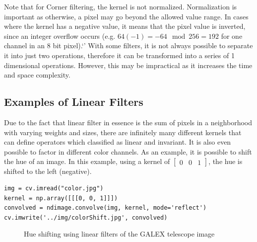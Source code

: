 \documentclass[twoside,a4paper,article]{combine}
\begin{document}
Note that for Corner filtering, the kernel is not normalized. Normalization is important as otherwise, a pixel may go beyond the allowed value range.
In cases where the kernel has a negative value, it means that the pixel value is inverted, since an integer overflow occurs (e.g. $64
(-1)= -64 \mod 256 = 192$ for one channel in an 8 bit pixel).`'
With some filters, it is not always possible to separate it into just two operations, therefore it can be
transformed into a series of 1 dimensional operations. However, this may be impractical as it increases the time and space
complexity.

\subsection{Examples of Linear Filters}
Due to the fact that linear filter in essence is the sum of pixels in a neighborhood with varying weights and sizes, there are infinitely many different kernels that can
define operators which classified as linear and invariant. It is also even possible to factor in different color channels. As an example, it is possible to shift the hue of an image.
In this example, using a kernel of $\begin{bmatrix}0 & 0 & 1\end{bmatrix}$, the hue is shifted to the left (negative).
\lstset{language=Python}
\begin{lstlisting}
img = cv.imread("color.jpg")
kernel = np.array([[[0, 0, 1]]])
convolved = ndimage.convolve(img, kernel, mode='reflect')
cv.imwrite('../img/colorShift.jpg', convolved)
\end{lstlisting}


\begin{minipage}{\textwidth}\begin{figure}[H]
    \centering
    \caption{Hue shifting using linear filters of the GALEX telescope image\cite{NASA_on_The_Commons_23}}
    \label{fig:hueshift}
\end{figure}\end{minipage}
\end{document}
